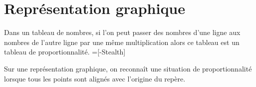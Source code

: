 \section{Représentation graphique}
\begin{remarque}
    Dans un tableau de nombres, si l'on peut passer des nombres d'une ligne aux nombres de l'autre ligne par une même multiplication alors ce tableau est un tableau de proportionnalité.    
    =[-{Stealth}]
    \vspace*{-10mm}
    \begin{center}
    \end{center}
\end{remarque}
\vspace*{-10mm}
\begin{propriete}[\admise]
    Sur une représentation graphique, on reconnaît une situation de proportionnalité lorsque tous les points sont alignés avec l'origine du repère.
\end{propriete}

